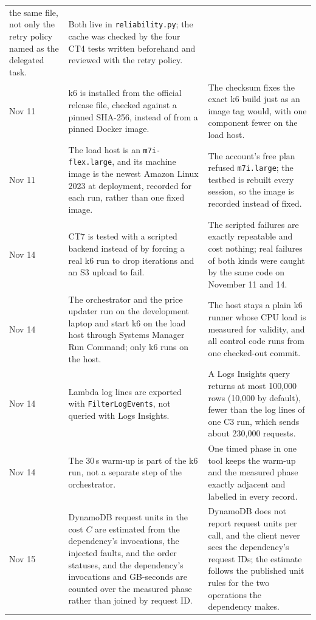 \documentclass[10pt]{article}
\begin{document}
\begin{table}[htbp]
\begin{tabularx}{\linewidth}{@{}l>{\RaggedRight}X>{\RaggedRight\arraybackslash}X@{}}
  the same file, not only the retry policy named as the delegated task. &
  Both live in \texttt{reliability.py}; the cache was checked by the four CT4
  tests written beforehand and reviewed with the retry policy. \\
Nov 11 & k6 is installed from the official release file, checked against a
  pinned SHA-256, instead of from a pinned Docker image. &
  The checksum fixes the exact k6 build just as an image tag would, with one
  component fewer on the load host. \\
Nov 11 & The load host is an \texttt{m7i-flex.large}, and its machine image
  is the newest Amazon Linux 2023 at deployment, recorded for each run, rather
  than one fixed image. &
  The account's free plan refused \texttt{m7i.large}; the testbed is rebuilt
  every session, so the image is recorded instead of fixed. \\
Nov 14 & CT7 is tested with a scripted backend instead of by forcing a real
  k6 run to drop iterations and an S3 upload to fail. &
  The scripted failures are exactly repeatable and cost nothing; real
  failures of both kinds were caught by the same code on November 11 and 14. \\
Nov 14 & The orchestrator and the price updater run on the development
  laptop and start k6 on the load host through Systems Manager Run Command;
  only k6 runs on the host. &
  The host stays a plain k6 runner whose CPU load is measured for validity,
  and all control code runs from one checked-out commit. \\
Nov 14 & Lambda log lines are exported with \texttt{FilterLogEvents}, not
  queried with Logs Insights. &
  A Logs Insights query returns at most 100{,}000 rows (10{,}000 by default),
  fewer than the log lines of one C3 run, which sends about 230{,}000
  requests. \\
Nov 14 & The 30\,s warm-up is part of the k6 run, not a separate step of the
  orchestrator. &
  One timed phase in one tool keeps the warm-up and the measured phase
  exactly adjacent and labelled in every record. \\
Nov 15 & DynamoDB request units in the cost $C$ are estimated from the
  dependency's invocations, the injected faults, and the order statuses, and
  the dependency's invocations and GB-seconds are counted over the measured
  phase rather than joined by request ID. &
  DynamoDB does not report request units per call, and the client never sees
  the dependency's request IDs; the estimate follows the published unit rules
  for the two operations the dependency makes. \\

\end{tabularx}
\end{table}
\end{document}
